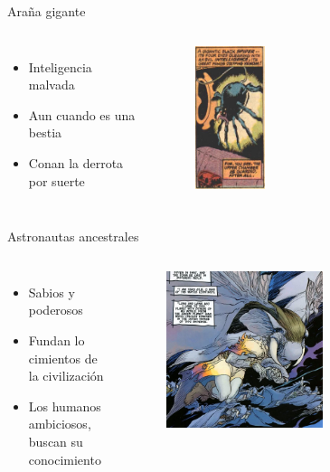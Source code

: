 \begin{frame}{Araña gigante}
  \begin{columns}
    \begin{itemize}
      \item Inteligencia malvada
      \item Aun cuando es una bestia
      \item Conan la derrota por suerte
    \end{itemize}
    \begin{figure}[htb]
      \centering
      \includegraphics[width=0.3\textwidth]{img/tropes/arana}
    \end{figure}
  \end{columns}
\end{frame}

\begin{frame}{Astronautas ancestrales}
\begin{columns}
 \begin{itemize}
    \item Sabios y poderosos
    \item Fundan lo cimientos de la civilización
    \item Los humanos ambiciosos, buscan su conocimiento
 \end{itemize}
    \begin{figure}[htb]
      \centering
      \includegraphics[width=0.6\textwidth]{img/tropes/astronautas}
    \end{figure}
  \end{columns}
\end{frame}

